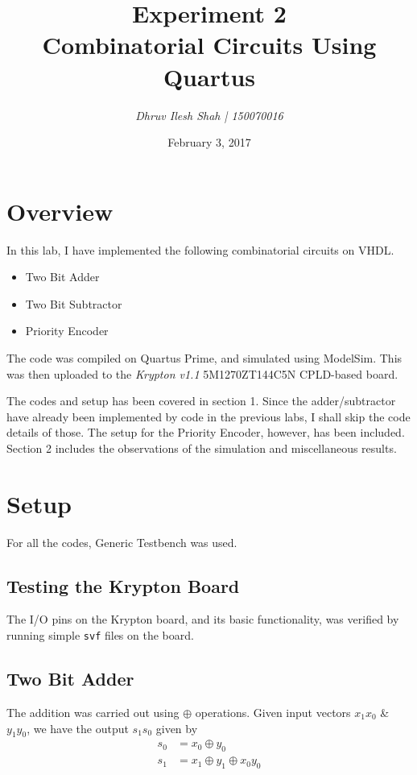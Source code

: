\documentclass[a4paper, 11pt]{article}
\title{\bf Experiment 2\\\vspace*{2mm} Combinatorial Circuits Using Quartus}
\author{\it Dhruv Ilesh Shah | 150070016}
\date{February 3, 2017}
\begin{document}
\maketitle
\section*{Overview}
In this lab, I have implemented the following combinatorial circuits on VHDL.
\begin{itemize}
	\item Two Bit Adder
	\item Two Bit Subtractor
	\item Priority Encoder
\end{itemize}
The code was compiled on Quartus Prime, and simulated using ModelSim. This was then uploaded to the {\em Krypton v1.1} 5M1270ZT144C5N CPLD-based board.

The codes and setup has been covered in section 1. Since the adder/subtractor have already been implemented by code in the previous labs, I shall skip the code details of those. The setup for the Priority Encoder, however, has been included. Section 2 includes the observations of the simulation and miscellaneous results.
\section{Setup}
For all the codes, Generic Testbench was used.

\subsection{Testing the Krypton Board}
The I/O pins on the Krypton board, and its basic functionality, was verified by running simple \texttt{svf} files on the board.

\subsection{Two Bit Adder}

The addition was carried out using $\oplus$ operations. Given input vectors $x_1x_0$ \& $y_1y_0$, we have the output $s_1s_0$ given by
\begin{equation}
\begin{split}
s_0 &= x_0 \oplus y_0 \\
s_1 &= x_1 \oplus y_1 \oplus x_0y_0
\end{split}
\end{equation}
\end{document}
